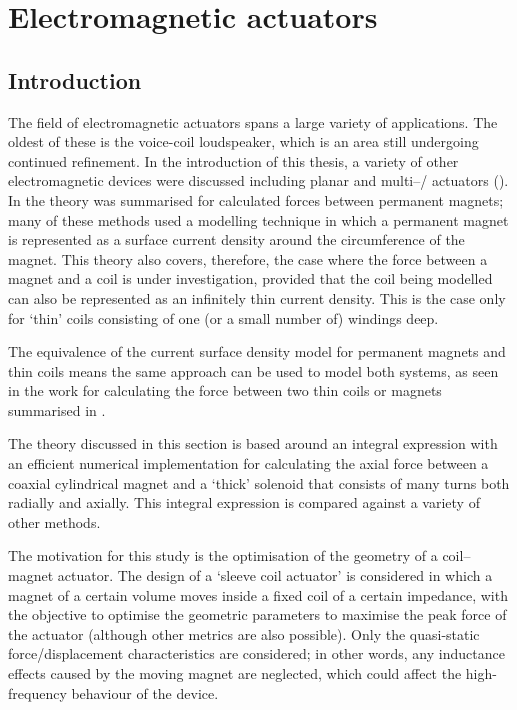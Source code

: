 \documentclass[11pt,a4paper]{memoir}
\begin{document}
\chapter{Electromagnetic actuators}


\section{Introduction}

The field of electromagnetic actuators spans a large variety of applications.
The oldest of these is the voice-coil loudspeaker, which is an area still undergoing continued refinement.
In the introduction of this thesis, a variety of other electromagnetic devices were discussed including planar and multi--\dof/ actuators ().
In  the theory was summarised for calculated forces between permanent magnets; many of these methods used a modelling technique in which a permanent magnet is represented as a surface current density around the circumference of the magnet.
This theory also covers, therefore, the case where the force between a magnet and a coil is under investigation, provided that the coil being modelled can also be represented as an infinitely thin current density.
This is the case only for `thin' coils consisting of one (or a small number of) windings deep.

The equivalence of the current surface density model for permanent magnets and thin coils means the same approach can be used to model both systems, as seen in the work for calculating the force between two thin coils or magnets \cite{babic2008-ietm,ravaud2010-ietm,robertson2011-ietm} summarised in .

The theory discussed in this section is based around an integral expression with an efficient numerical implementation for calculating the axial force between a coaxial cylindrical magnet and a `thick' solenoid that consists of many turns both radially and axially.
This integral expression is compared against a variety of other methods.

The motivation for this study is the optimisation of the geometry of a coil--magnet actuator.
The design of a `sleeve coil actuator' is considered in which a magnet of a certain volume moves inside a fixed coil of a certain impedance, with the objective to optimise the geometric parameters to maximise the peak force of the actuator (although other metrics are also possible).
Only the quasi-static force/displacement characteristics are considered; in other words, any inductance effects caused by the moving magnet are neglected, which could affect the high-frequency behaviour of the device.
\end{document}
